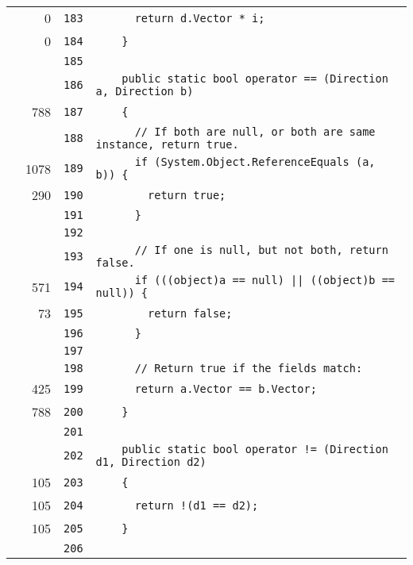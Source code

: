 \documentclass[a4paper,10pt]{article}
\begin{document}
\begin{longtable}[l]{lrrl}
\cellcolor{red} & 0 & \verb~183~ & \verb~      return d.Vector * i;~\\
\cellcolor{red} & 0 & \verb~184~ & \verb~    }~\\
\cellcolor{gray} &  & \verb~185~ & \verb~~\\
\cellcolor{gray} &  & \verb~186~ & \verb~    public static bool operator == (Direction a, Direction b)~\\
\cellcolor{green} & 788 & \verb~187~ & \verb~    {~\\
\cellcolor{gray} &  & \verb~188~ & \verb~      // If both are null, or both are same instance, return true.~\\
\cellcolor{green} & 1078 & \verb~189~ & \verb~      if (System.Object.ReferenceEquals (a, b)) {~\\
\cellcolor{green} & 290 & \verb~190~ & \verb~        return true;~\\
\cellcolor{gray} &  & \verb~191~ & \verb~      }~\\
\cellcolor{gray} &  & \verb~192~ & \verb~~\\
\cellcolor{gray} &  & \verb~193~ & \verb~      // If one is null, but not both, return false.~\\
\cellcolor{green} & 571 & \verb~194~ & \verb~      if (((object)a == null) || ((object)b == null)) {~\\
\cellcolor{green} & 73 & \verb~195~ & \verb~        return false;~\\
\cellcolor{gray} &  & \verb~196~ & \verb~      }~\\
\cellcolor{gray} &  & \verb~197~ & \verb~~\\
\cellcolor{gray} &  & \verb~198~ & \verb~      // Return true if the fields match:~\\
\cellcolor{green} & 425 & \verb~199~ & \verb~      return a.Vector == b.Vector;~\\
\cellcolor{green} & 788 & \verb~200~ & \verb~    }~\\
\cellcolor{gray} &  & \verb~201~ & \verb~~\\
\cellcolor{gray} &  & \verb~202~ & \verb~    public static bool operator != (Direction d1, Direction d2)~\\
\cellcolor{green} & 105 & \verb~203~ & \verb~    {~\\
\cellcolor{green} & 105 & \verb~204~ & \verb~      return !(d1 == d2);~\\
\cellcolor{green} & 105 & \verb~205~ & \verb~    }~\\
\cellcolor{gray} &  & \verb~206~ & \verb~~\\

\end{longtable}
\end{document}

